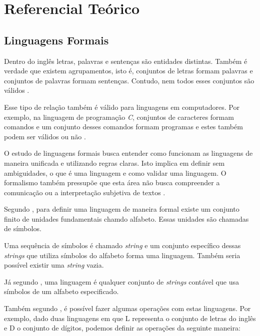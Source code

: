 \chapter[Referencial Teórico]{Referencial Teórico}

\section{Linguagens Formais}
\label{sec:languages}


Dentro do inglês letras, palavras e sentenças são entidades distintas.
Também é verdade que existem agrupamentos, isto é, conjuntos de letras
formam palavras e conjuntos de palavras formam sentenças. Contudo, 
nem todos esses conjuntos são válidos \cite{cohen1986}.

Esse tipo de relação também é válido para linguagens em computadores.
Por exemplo, na linguagem de programação \textit{C}, conjuntos de caracteres formam comandos
e um conjunto desses comandos formam programas e estes também podem ser válidos ou não \cite{cohen1986}.

O estudo de linguagens formais busca entender como funcionam as linguagens de maneira unificada 
e utilizando regras claras. Isto implica em definir sem ambiguidades, o que é uma linguagem e
como validar uma linguagem. O formalismo também pressupõe que esta área não busca
compreender a comunicação ou a interpretação subjetiva de textos \cite{cohen1986}.

Segundo , para definir uma linguagem de maneira formal 
existe um conjunto finito de unidades fundamentais chamdo alfabeto. Essas unidades
são chamadas de símbolos.

Uma sequência de símbolos é chamado \textit{string} e um conjunto específico dessas \textit{strings} 
que utiliza símbolos do alfabeto forma uma linguagem. Também seria possível existir uma \textit{string} vazia. 

Já segundo , uma linguagem é qualquer conjunto de \textit{strings} contável
que usa símbolos de um alfabeto especificado.

Também segundo , é possível fazer algumas operações com estas linguagens.
Por exemplo, dado duas linguagens em que L representa o conjunto de letras do inglês 
e D o conjunto de dígitos, podemos definir as operações da seguinte maneira:

